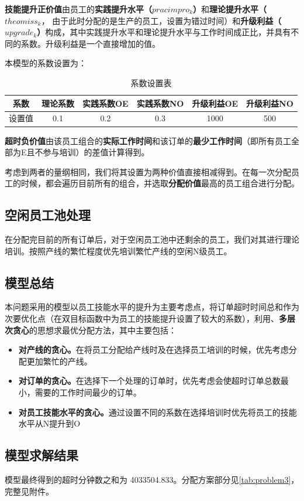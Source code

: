 \textbf{技能提升正价值}由员工的\textbf{实践提升水平（$pracimpro_k$）}和\textbf{理论提升水平（$theomiss_k$}， 由于此时分配的是生产的员工，设置为错过时间）和\textbf{升级利益（$upgrade_k$）}构成，其中实践提升水平和理论提升水平与工作时间成正比，并具有不同的系数。升级利益是一个直接增加的值。

本模型的系数设置为：

\begin{table}[htbp]
    \caption{系数设置表}
    \label{tab:ratio} 
    \centering
    \begin{tabular}{c|ccccc}
        \toprule[1.5pt]
        系数 & 理论系数 & 实践系数OE& 实践系数NO&
        升级利益OE&
        升级利益NO\\
        \midrule[1pt]
        设置值  & 0.1 &  0.2 & 0.3 & 1000 & 500     \\
        \bottomrule[1.5pt]
    \end{tabular}
\end{table}


\textbf{超时负价值}由该员工组合的\textbf{实际工作时间}和该订单的\textbf{最少工作时间}（即所有员工全部为E且不参与培训）的差值计算得到。

考虑到两者的量纲相同，我们将其设置为两种价值直接相减得到。在每一次分配员工的时候，都会遍历目前所有的组合，并选取\textbf{分配价值}最高的员工组合进行分配。

\subsection{空闲员工池处理}

在分配完目前的所有订单后，对于空闲员工池中还剩余的员工，我们对其进行理论培训。按照产线的繁忙程度优先培训繁忙产线的空闲N级员工。

\subsection{模型总结}

本问题采用的模型以员工技能水平的提升为主要考虑点，将订单超时时间总和作为次要优化点（在双目标函数中为员工的技能提升设置了较大的系数），利用、\textbf{多层次贪心}的思想求最优分配方法，其中主要包括：

\begin{itemize}[left=1em]
    \item \textbf{对产线的贪心。}在将员工分配给产线时及在选择员工培训的时候，优先考虑分配更加繁忙的产线。
    \item \textbf{对订单的贪心。}在选择下一个处理的订单时，优先考虑会使超时订单总数最小，需要的工作时间最少的订单。
    \item \textbf{对员工技能水平的贪心。}通过设置不同的系数在选择培训时优先将员工的技能水平从N提升到O
\end{itemize}

\subsection{模型求解结果}
模型最终得到的超时分钟数之和为 4033504.833。分配方案部分见\cref{tab:problem3}，完整见附件。



